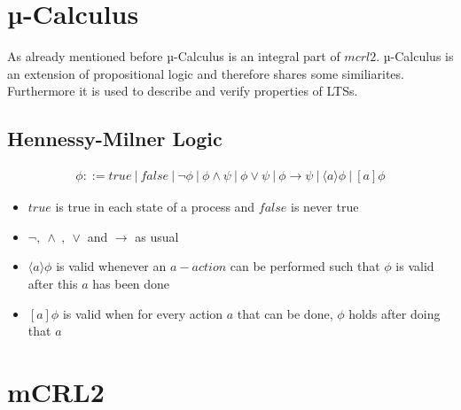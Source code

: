 \documentclass{clseminar}
\begin{document}
  \section{µ-Calculus}
  As already mentioned before µ-Calculus is an integral part of $mcrl2$. µ-Calculus is an extension of propositional logic and therefore shares some similiarites. \\
  Furthermore it is used to describe and verify properties of LTSs.

  \subsection{Hennessy-Milner Logic}
  \begin{align*}
    \phi ::= \mathit{true}\ |\ \mathit{false}\ |\ \neg \phi\ |\ \phi \land \psi\ |\ \phi \lor \psi\ |\ \phi \to \psi\ |\ \langle a \rangle \phi \ |\ [a]\phi
  \end{align*}
  \begin{itemize}
    \item $\mathit{true}$ is true in each state of a process and $\mathit{false}$ is never true
    \item $\neg ,\ \land\ ,\ \lor$ and $\to$ as usual
    \item $\langle a \rangle \phi$ is valid whenever an $a-action$ can be performed such that $\phi$ is valid after this $a$ has been done
    \item $[a]\phi$ is valid when for every action $a$ that can be done, $\phi$ holds after doing that $a$
  \end{itemize}

  \section{mCRL2}
\end{document}
